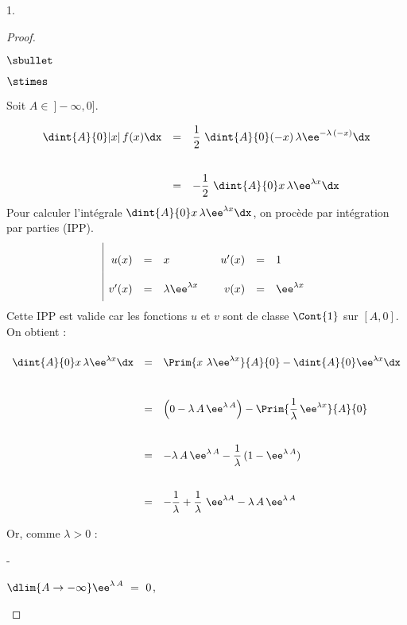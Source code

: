 \documentclass[11pt]{article}%
\begin{document}
\begin{noliste}{1.}
\begin{proof}
\begin{noliste}{$\sbullet$}
\begin{noliste}{$\stimes$}
      \item Soit $A \in \ ]-\infty, 0]$.
        \[
          \begin{array}{rcl}
            \dint{A}{0} \vert x \vert \, f(x) \dx
            & = & \dfrac{1}{2} \ \dint{A}{0} (-x) \, \lambda \ee^{-
                  \lambda \, (-x)} \dx
            \\[.6cm]
            & = & - \dfrac{1}{2} \ \dint{A}{0} x \, \lambda
                  \ee^{\lambda x} \dx
          \end{array}
        \]
        Pour calculer l'intégrale $\dint{A}{0} x \, \lambda
        \ee^{\lambda x} \dx$, on procède par intégration par parties (IPP).
        \[
          \renewcommand{\arraystretch}{2.2}
          \begin{array}{|rcl@{\qquad}rcl}
            u(x) & = & x & u'(x) & = & 1 \\
            v'(x) & = & \lambda \ee^{\lambda x} & v(x) & = & \ee^{\lambda x}
          \end{array}
        \]
        Cette IPP est valide car les fonctions $u$ et $v$ sont 
        de classe $\Cont{1}$
        sur $[A, 0]$. On obtient :
        \[
          \begin{array}{rcl}
            \dint{A}{0} x \, \lambda \ee^{\lambda x} \dx
            & = & \Prim{x \ \lambda \ee^{\lambda x}}{A}{0} -
                  \dint{A}{0} \ee^{\lambda x} \dx
            \\[.6cm]
            & = & \left(0 -\lambda \, A \, \ee^{\lambda \, A}\right) -
                  \Prim{ \dfrac{1}{\lambda} \, \ee^{\lambda x}}{A}{0}
            \\[.6cm]
            & = & - \lambda \, A \, \ee^{\lambda \, A}
                  -\dfrac{1}{\lambda} \, (1-\ee^{\lambda \, A})
            \\[.6cm]
            & = & -\dfrac{1}{\lambda} + \dfrac{1}{\lambda} \
                  \ee^{\lambda A} - \lambda \, A \, \ee^{\lambda \, A}
          \end{array}
        \]


        \newpage

        
        \noindent
        Or, comme $\lambda >0$ :
        \begin{noliste}{-}
        \item $\dlim{A \to - \infty} \ee^{\lambda \, A} \ = \ 0$,
          

\end{noliste}
\end{noliste}
\end{noliste}
\end{proof}
\end{noliste}
\end{document}
